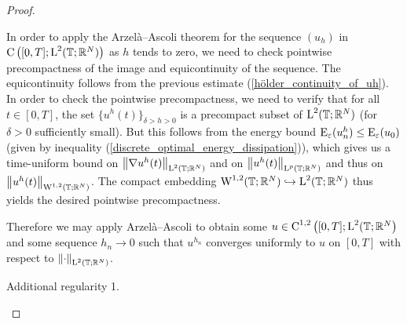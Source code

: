 \begin{proof}
\begin{description}[wide=0pt]
		In order to apply the Arzelà--Ascoli theorem for the sequence $ (u_{ h 
		} ) $ in $ \operatorname{C} \left( [ 0 , T ] ; \operatorname{L}^{ 2 } ( \operatorname{\mathbb{T}} ; \mathbb{ R 
		}^{ N } ) \right) $ as $ h $ tends to zero, we need to check pointwise 
		precompactness 
		of the image and equicontinuity of the sequence. 
		The equicontinuity follows from the previous estimate (\ref{hölder_continuity_of_uh}).
		In order to check the pointwise precompactness, we need to verify that for all $ t \in [ 0 , T ] $, the set
		$ \{ u^{ h } ( t ) \}_{ \delta > h > 0 } $ is a precompact subset of $ \operatorname{L}^{ 2 } ( \operatorname{\mathbb{T}} ; \mathbb{ R }^{ N } ) $ (for $ \delta > 0 $ sufficiently small). 
		But this follows from the energy bound $ \operatorname{E}_{ \varepsilon } ( u_{ n }^{ h } ) \leq \operatorname{E}_{ \varepsilon } ( u_{ 0 } ) $ (given by inequality (\ref{discrete_optimal_energy_dissipation})), which gives us a time-uniform bound on $ \norm{ \nabla u^{ h }( t ) }_{\operatorname{L}^{ 2 }( \operatorname{\mathbb{T}}; \mathbb{ R }^{ N } ) } $ and on $ \norm{ u^{ h } ( t )}_{ \operatorname{L}^{ p } ( \operatorname{\mathbb{T}}; \mathbb{ R }^{ N } ) } $ and thus on $ \norm{ u^{ h } ( t )}_{ \operatorname{W}^{ 1 , 2 } ( \operatorname{\mathbb{T}}; \mathbb{ R }^{ N } ) } $. The compact embedding
		$ \operatorname{W}^{ 1 , 2 } ( \operatorname{\mathbb{T}} ; \mathbb{ R }^{ N } ) \hookrightarrow \operatorname{L}^{ 2 } ( \operatorname{\mathbb{T}}; \mathbb{ R }^{ N } ) $ thus yields the desired pointwise precompactness.
		
		Therefore we may apply Arzelà--Ascoli to obtain some $ u \in \operatorname{C}^{ 1 , 2 } \left( [ 0, T ] ; \operatorname{L}^{ 2 } ( \operatorname{\mathbb{T}} ; \mathbb{ R }^{ N } \right) $ and some  sequence $ h_{ n } \to 0 $ such that
		$ u^{ h_{ n } } $ converges uniformly to $ u $ on $ [ 0 , T ] $ with respect to $ \norm{ \cdot }_{ \operatorname{L}^{ 2 } ( \operatorname{\mathbb{T}} ; \mathbb{ R }^{ N } ) } $.
		
		\item[Step 6:] Additional regularity 1.
		

\end{description}
\end{proof}
